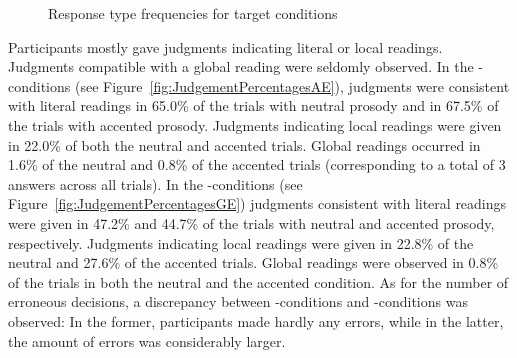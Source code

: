 \documentclass[fleqn,reqno,10pt,draft]{article}
\newcommand{\as}{\acro{as}}
\renewcommand{\es}{\acro{es}}
\begin{document}
\begin{figure}[]
{

\label{fig:JudgementPercentagesGE}
}
\caption[Optional caption for list of figures]{Response type
  frequencies for target conditions}
\label{fig:JudgementPercentages}
\end{figure}
%
Participants mostly gave judgments indicating literal or local
readings. Judgments compatible with a global reading were seldomly
observed. In the \as-conditions (see Figure~\ref{fig:JudgementPercentagesAE}),
judgments were consistent with literal readings in 65.0\% of the
trials with neutral prosody and in 67.5\% of the trials with accented
prosody. Judgments indicating local readings were given 
  in 22.0\% of both the neutral and accented trials. Global readings 
occurred in 1.6\% of the neutral and 0.8\% of the accented trials
(corresponding to a total of 3 answers across all trials).  
In the \es-conditions (see Figure~\ref{fig:JudgementPercentagesGE}) 
judgments consistent with literal readings were given in 47.2\% and 
44.7\% of the trials with neutral and accented prosody, respectively. 
Judgments indicating local readings were given in 22.8\% of
the neutral and 27.6\% of the accented trials. Global readings were
observed in 0.8\% of the trials in both the neutral and the accented
condition. 
As for the number of erroneous decisions, a discrepancy between 
\as-conditions and \es-conditions was observed: In the former, 
participants made hardly any errors, while in the latter, the amount 
of errors was considerably larger.
\end{document}
